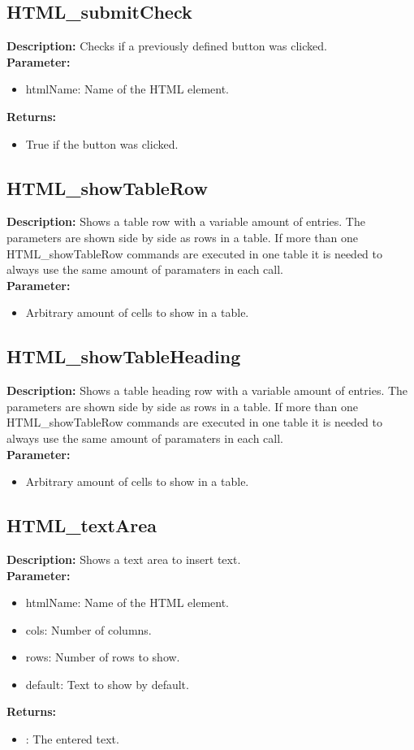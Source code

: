 \subsection{HTML\_submitCheck}
\textbf{Description:} Checks if a previously defined button was clicked.\\
\textbf{Parameter:}
\begin{itemize}
\item htmlName: Name of the HTML element.
\end{itemize}
\textbf{Returns:}
\begin{itemize}
\item True if the button was clicked.
\end{itemize}

\subsection{HTML\_showTableRow}
\textbf{Description:} Shows a table row with a variable amount of entries. The parameters are shown side by side as rows in a table. If more than one HTML\_showTableRow commands are executed in one table it is needed to always use the same amount of paramaters in each call.\\
\textbf{Parameter:}
\begin{itemize}
\item Arbitrary amount of cells to show in a table.
\end{itemize}

\subsection{HTML\_showTableHeading}
\textbf{Description:} Shows a table heading row with a variable amount of entries. The parameters are shown side by side as rows in a table. If more than one HTML\_showTableRow commands are executed in one table it is needed to always use the same amount of paramaters in each call.\\
\textbf{Parameter:}
\begin{itemize}
\item Arbitrary amount of cells to show in a table.
\end{itemize}

\subsection{HTML\_textArea}
\textbf{Description:} Shows a text area to insert text.\\
\textbf{Parameter:}
\begin{itemize}
\item htmlName: Name of the HTML element.
\item cols: Number of columns.
\item rows: Number of rows to show.
\item default: Text to show by default.
\end{itemize}
\textbf{Returns:}
\begin{itemize}
\item : The entered text.
\end{itemize}

